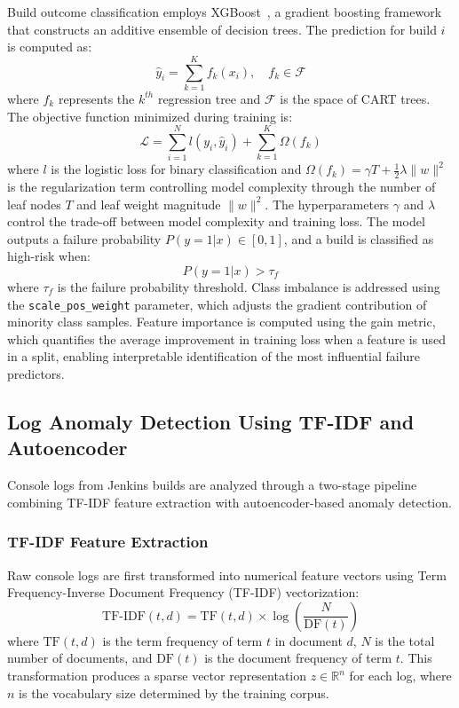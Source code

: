 \documentclass[a4paper,fleqn]{cas-dc}
\begin{document}
Build outcome classification employs XGBoost~\citep{chen2016xgboost}, a gradient boosting framework that constructs an additive ensemble of decision trees.
The prediction for build $i$ is computed as:
\begin{equation}
\hat{y}_i = \sum_{k=1}^{K} f_k(x_i), \quad f_k \in \mathcal{F}
\end{equation}
where $f_k$ represents the $k^{th}$ regression tree and $\mathcal{F}$ is the space of CART trees.
The objective function minimized during training is:
\begin{equation}\label{eq:xgboost_obj}
\mathcal{L} = \sum_{i=1}^{N} l(y_i, \hat{y}_i) + \sum_{k=1}^{K} \Omega(f_k)
\end{equation}
where $l$ is the logistic loss for binary classification and $\Omega(f_k) = \gamma T + \frac{1}{2}\lambda \|w\|^2$ is the regularization term controlling model complexity through the number of leaf nodes $T$ and leaf weight magnitude $\|w\|^2$.
The hyperparameters $\gamma$ and $\lambda$ control the trade-off between model complexity and training loss.
The model outputs a failure probability $P(y=1|x) \in [0, 1]$, and a build is classified as high-risk when:
\begin{equation}
P(y=1|x) > \tau_f
\end{equation}
where $\tau_f$ is the failure probability threshold.
Class imbalance is addressed using the \texttt{scale\_pos\_weight} parameter, which adjusts the gradient contribution of minority class samples.
Feature importance is computed using the gain metric, which quantifies the average improvement in training loss when a feature is used in a split, enabling interpretable identification of the most influential failure predictors.

\subsection{Log Anomaly Detection Using TF-IDF and Autoencoder}\label{subsec:loganomaly}

Console logs from Jenkins builds are analyzed through a two-stage pipeline combining TF-IDF feature extraction with autoencoder-based anomaly detection.

\subsubsection{TF-IDF Feature Extraction}
Raw console logs are first transformed into numerical feature vectors using Term Frequency-Inverse Document Frequency (TF-IDF) vectorization:
\begin{equation}
\text{TF-IDF}(t,d) = \text{TF}(t,d) \times \log \left(\frac{N}{\text{DF}(t)}\right)
\end{equation}
where $\text{TF}(t,d)$ is the term frequency of term $t$ in document $d$, $N$ is the total number of documents, and $\text{DF}(t)$ is the document frequency of term $t$.
This transformation produces a sparse vector representation $z \in \mathbb{R}^n$ for each log, where $n$ is the vocabulary size determined by the training corpus.
\end{document}
